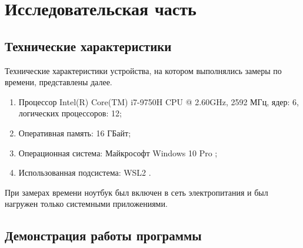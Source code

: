 \chapter{Исследовательская часть}

\section{Технические характеристики}

Технические характеристики устройства, на котором выполнялись замеры по времени, представлены далее.

\begin{enumerate}
	\item Процессор	Intel(R) Core(TM) i7-9750H CPU @ 2.60GHz, 2592 МГц, ядер: 6, логических процессоров: 12;
	\item Оперативная память: 16 ГБайт;
	\item Операционная система: Майкрософт Windows 10 Pro \cite{windows};
	\item Использованная подсистема: WSL2 \cite{WSL2}.
\end{enumerate}

При замерах времени ноутбук был включен в сеть электропитания и был нагружен только системными приложениями.

\section{Демонстрация работы программы}

